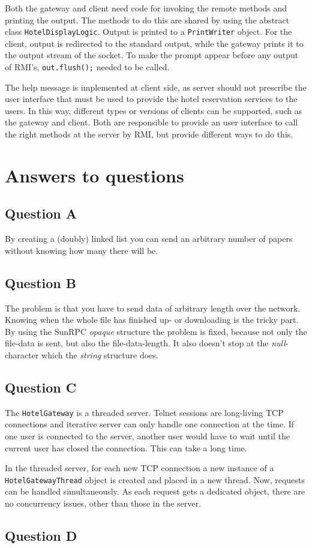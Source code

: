 \documentclass[11pt]{article}
\begin{document}
Both the gateway and client need code for invoking the remote methods and printing the output. The methods to do this are shared by using the abstract class \texttt{HotelDisplayLogic}. Output is printed to a \texttt{PrintWriter} object. For the client, output is redirected to the standard output, while the gateway prints it to the output stream of the socket. To make the prompt appear before any output of RMI's, \texttt{out.flush();} needed to be called.

The help message is implemented at client side, as server should not prescribe the user interface that must be used to provide the hotel reservation services to the users. In this way, different types or versions of clients can be supported, such as the gateway and client. Both are responsible to provide an user interface to call the right methods at the server by RMI, but provide different ways to do this.

\section{Answers to questions}
\subsection{Question A}
By creating a (doubly) linked list you can send an arbitrary number of papers without knowing how many there will be.
\subsection{Question B}
The problem is that you have to send data of arbitrary length over the network. Knowing when the whole file has finished up- or downloading is the tricky part. By using the SunRPC \textit{opaque} structure the problem is fixed, because not only the file-data is sent, but also the file-data-length. It also doesn't stop at the \textit{null}-character which the \textit{string} structure does.

\subsection{Question C}

The \texttt{HotelGateway} is a threaded server. Telnet sessions are long-living TCP connections and iterative server can only handle one connection at the time. If one user is connected to the server, another user would have to wait until the current user has closed the connection. This can take a long time.

In the threaded server, for each new TCP connection a new instance of a \texttt{HotelGatewayThread} object is created and placed in a new thread. Now, requests can be handled simultaneously. As each request gets a dedicated object, there are no concurrency issues, other than those in the server.

\subsection{Question D}
\end{document}
